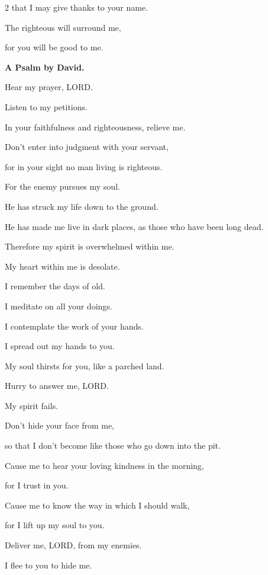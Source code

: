 \begin{multicols}{2}
	that I may give thanks to your name.
	
	The righteous will surround me,
	
	for you will be good to me.
	
	
	\mychapter{}\textbf{A Psalm by David.}
	
	\quad\quad\quad  \myverse*{}Hear my prayer, LORD.
	
	Listen to my petitions.
	
	In your faithfulness and righteousness, relieve me.
	
	
	\myverse{}Don’t enter into judgment with your servant,
	
	for in your sight no man living is righteous.
	
	
	\myverse{}For the enemy pursues my soul.
	
	He has struck my life down to the ground.
	
	He has made me live in dark places, as those who have been long dead.
	
	
	\myverse{}Therefore my spirit is overwhelmed within me.
	
	My heart within me is desolate.
	
	
	\myverse{}I remember the days of old.
	
	I meditate on all your doings.
	
	I contemplate the work of your hands.
	
	
	\myverse{}I spread out my hands to you.
	
	My soul thirsts for you, like a parched land.
	
	
	\vspace{\baselineskip}
	
	\myverse{}Hurry to answer me, LORD.
	
	My spirit fails.
	
	Don’t hide your face from me,
	
	so that I don’t become like those who go down into the pit.
	
	
	\myverse{}Cause me to hear your loving kindness in the morning,
	
	for I trust in you.
	
	Cause me to know the way in which I should walk,
	
	for I lift up my soul to you.
	
	
	\myverse{}Deliver me, LORD, from my enemies.
	
	I flee to you to hide me.
	

\end{multicols}
